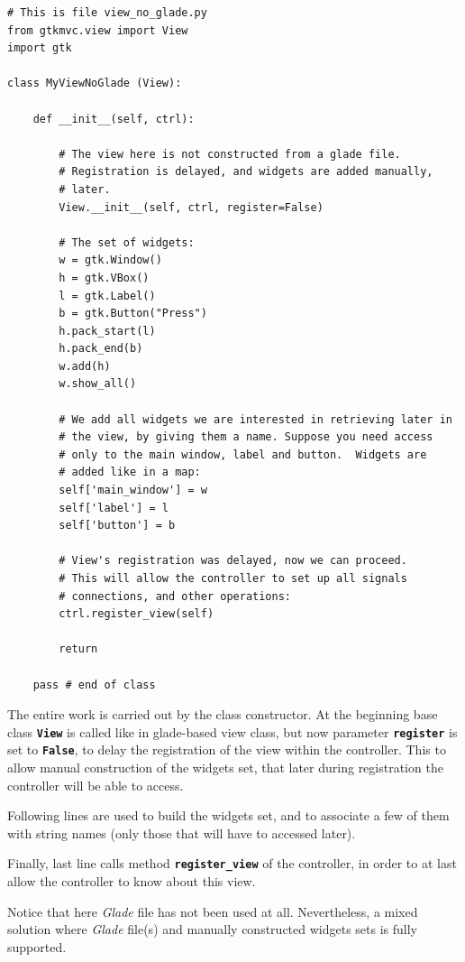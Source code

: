 \documentclass{article}
\newcommand{\appl}[1]{\textsl{#1}\xspace}
\newcommand{\glade}{\appl{Glade}}
\newcommand{\codename}[1]{\texttt{\bfseries \textcolor {codecolor}{#1}}\xspace}
\newcommand{\codesize}{\small \color{codecolor}}
\begin{document}
{ \codesize 
\begin{verbatim}   
# This is file view_no_glade.py
from gtkmvc.view import View
import gtk

class MyViewNoGlade (View):

    def __init__(self, ctrl):

        # The view here is not constructed from a glade file.
        # Registration is delayed, and widgets are added manually,
        # later.
        View.__init__(self, ctrl, register=False)
    
        # The set of widgets:
        w = gtk.Window()
        h = gtk.VBox()
        l = gtk.Label()
        b = gtk.Button("Press")
        h.pack_start(l)
        h.pack_end(b)
        w.add(h)
        w.show_all()

        # We add all widgets we are interested in retrieving later in
        # the view, by giving them a name. Suppose you need access
        # only to the main window, label and button.  Widgets are
        # added like in a map:
        self['main_window'] = w
        self['label'] = l
        self['button'] = b
        
        # View's registration was delayed, now we can proceed.
        # This will allow the controller to set up all signals
        # connections, and other operations:
        ctrl.register_view(self)

        return

    pass # end of class
\end{verbatim}
} 

The entire work is carried out by the class constructor. At the
beginning base class \codename{View} is called like in glade-based
view class, but now parameter \codename{register} is set to
\codename{False}, to delay the registration of the view within the
controller. This to allow manual construction of the widgets set, that
later during registration the controller will be able to access.

Following lines are used to build the widgets set, and to associate a
few of them with string names (only those that will have to accessed
later).

Finally, last line calls method \codename{register\_view} of the
controller, in order to at last allow the controller to know about
this view.

Notice that here \glade file has not been used at all. Nevertheless, a
mixed solution where \glade file(s) and manually constructed widgets
sets is fully supported.
\end{document}
